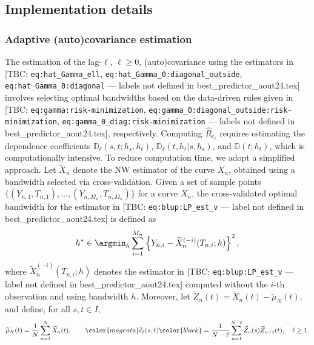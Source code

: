 \subsection{Implementation details}

\subsubsection{\color{magenta}Adaptive (auto)covariance estimation\color{black}}

\color{magenta}
The estimation of the lag-$\ell$, $\ell \geq 0$, (auto)covariance using the estimators in [TBC: \texttt{eq:hat\_Gamma\_ell}, \texttt{eq:hat\_Gamma\_0:diagonal\_outside}, \texttt{eq:hat\_Gamma\_0:diagonal} --- labels not defined in best\_predictor\_aout24.tex] involves selecting optimal bandwidths based on the data-driven rules given in [TBC: \texttt{eq:gamma:risk-minimization}, \texttt{eq:gamma\_0:diagonal\_outside:risk-minimization}, \texttt{eq:gamma\_0\_diag:risk-minimization} --- labels not defined in best\_predictor\_aout24.tex], respectively. Computing $\widehat{R}_{c_\ell}$ requires estimating the dependence coefficients $\mathbb{D}_\ell(s, t; h_s, h_t)$, $\mathbb{D}_\ell(t,h_t|s,h_s)$, and $\mathbb{D}(t; h_t)$, which is computationally intensive.
To reduce computation time, we adopt a simplified approach. Let $\widetilde{X}_n$ denote the NW estimator of the curve $X_n$, obtained using a bandwidth selected via cross-validation. Given a set of sample points $\{(Y_{n,1}, T_{n,1}), \ldots, (Y_{n,M_n}, T_{n,M_n})\}$ for a curve $X_n$, the cross-validated optimal bandwidth for the estimator in [TBC: \texttt{eq:blup:LP\_est\_v} --- label not defined in best\_predictor\_aout24.tex] is defined as
\color{black}
\begin{equation}\label{eq:NW_bw_cv}
	h^* \in \argmin_h \sum_{i = 1}^{M_n}\left\{Y_{n,i} - \widetilde{X}_n^{(-i)}(T_{n,i};h)\right\}^2,
\end{equation}
\color{magenta}
where $\widetilde{X}_n^{(-i)}(T_{n,i};h)$ denotes the estimator in [TBC: \texttt{eq:blup:LP\_est\_v} --- label not defined in best\_predictor\_aout24.tex] computed without the $i$-th observation and using bandwidth $h$. \color{black}Moreover, let $\widetilde{Z}_n(t) = \widetilde{X}_n(t) - \widetilde{\mu}_N(t)$, and define, for all $s, t \in I$,
\begin{equation*}
	\widetilde{\mu}_N(t) = \frac{1}{N} \sum_{n=1}^{N} \widetilde{X}_{n}(t), \qquad
	\color{magenta}\widetilde{c}_\ell(s, t)\color{black} = \frac{1}{N - \ell} \sum_{n = 1}^{N - \ell} \widetilde{Z}_n(s) \widetilde{Z}_{n + \ell}(t), \quad \ell \geq 1.
\end{equation*}
